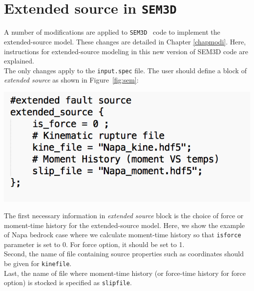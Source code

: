 \chapter{Extended source in \texttt{SEM3D}}

A number of modifications are applied to \texttt{SEM3D}~\cite{SEM3D} code to implement the extended-source model. These changes are detailed in Chapter \ref{chapmodi}. Here, instructions for extended-source modeling in this new version of SEM3D code are explained. \\


The only changes apply to the \texttt{input.spec} file. The user should define a block of \textit{extended source} as shown in Figure~\ref{fig:sem}: \\


\begin{center}
\leavevmode
\includegraphics[scale=0.5]{figures/input-moment.png} 
\label{fig:sem} 
\vspace{1cm}
\end{center}



The first necessary information in \textit{extended source} block is the choice of force or moment-time history for the extended-source model. Here, we show the example of Napa bedrock case where we calculate moment-time history so that \texttt{is\textunderscore force} parameter is set to 0. For force option, it should be set to 1. \\


Second, the name of file containing source properties such as coordinates should be given for \texttt{kine\textunderscore file}. \\

Last, the name of file where moment-time history (or force-time history for force option) is stocked is specified as \texttt{slip\textunderscore file}.